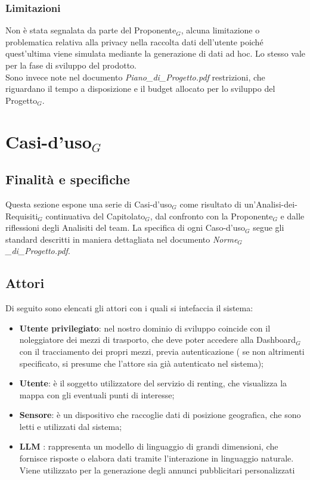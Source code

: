 \documentclass[11pt]{article}
\begin{document}
\begin{justify}
\subsubsection{Limitazioni}
Non è stata segnalata da parte del Proponente$_G$, alcuna limitazione o problematica relativa alla privacy nella raccolta dati dell'utente poiché quest'ultima viene simulata mediante la generazione di dati ad hoc. Lo stesso vale per la fase di sviluppo del prodotto.\\
Sono invece note nel documento \textit{Piano\_di\_Progetto.pdf} restrizioni, che riguardano il tempo a disposizione e il budget allocato per lo sviluppo del Progetto$_G$. 

\newpage
\section{Casi-d'uso$_G$}
\label{sec:casi-uso}

\subsection{Finalità e specifiche}
Questa sezione espone una serie di Casi-d'uso$_G$ come risultato di un'Analisi-dei-Requisiti$_G$ continuativa del Capitolato$_G$, dal confronto con la Proponente$_G$ e dalle riflessioni degli Analisiti del team. La specifica di ogni Caso-d'uso$_G$ segue gli standard descritti in maniera dettagliata nel documento \textit{Norme$_G$\_di\_Progetto.pdf}.
\subsection{Attori}
Di seguito sono elencati gli attori con i quali si intefaccia il sistema:
\begin{itemize}
    \item \textbf{Utente privilegiato}: nel nostro dominio di sviluppo coincide con il noleggiatore dei mezzi di trasporto, che deve poter accedere alla Dashboard$_G$ con il tracciamento dei propri mezzi, previa autenticazione ( se non altrimenti specificato, si presume che l'attore sia già autenticato nel sistema);
    \item \textbf{Utente}: è il soggetto utilizzatore del servizio di renting, che visualizza la mappa con gli eventuali punti di interesse;
    \item \textbf{Sensore}: è un dispositivo che raccoglie dati di posizione geografica, che sono letti e utilizzati dal sistema;
    \item \textbf{LLM} : rappresenta un modello di linguaggio di grandi dimensioni, che fornisce risposte o elabora dati tramite l'interazione in linguaggio naturale. Viene utilizzato per la generazione degli annunci pubblicitari personalizzati
\end{itemize}


\end{justify}
\end{document}

